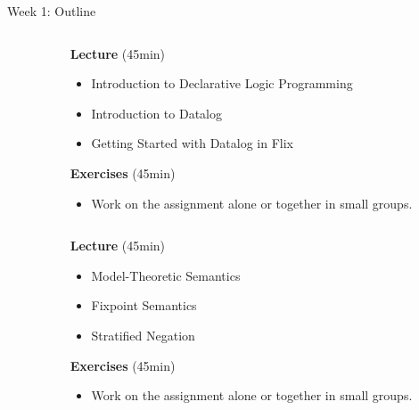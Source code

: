 \begin{frame}{Week 1: Outline}

\color{gray}
\begin{columns}
\begin{column}{.05\textwidth}
\end{column}
\begin{column}{.95\textwidth}
    \footnotesize
\textbf{Lecture} (45min)  \vspace{-2mm}
\begin{itemize}
    \color{gray}
    \setlength\itemsep{-0.5em}
    \item Introduction to Declarative Logic Programming
    \item Introduction to Datalog
    \item Getting Started with Datalog in Flix
\end{itemize}
\textbf{Exercises} (45min) \vspace{-2mm}
\begin{itemize}
    \color{gray}
    \item Work on the assignment alone or together in small groups.
\end{itemize}
\end{column}
\end{columns}

\medskip
\medskip
\medskip

\color{black}
\begin{columns}
\begin{column}{.05\textwidth}
\end{column}
\begin{column}{.95\textwidth}
\footnotesize
\textbf{Lecture} (45min) \vspace{-2mm}
\begin{itemize}
    \setlength\itemsep{-0.5em}
    \item Model-Theoretic Semantics
    \item Fixpoint Semantics
    \item Stratified Negation
\end{itemize}
\textbf{Exercises} (45min)  \vspace{-2mm}
\begin{itemize}
    \item Work on the assignment alone or together in small groups.
\end{itemize}
\end{column}
\end{columns}
\end{frame}

